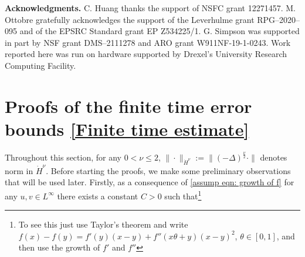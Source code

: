 \documentclass[reqno, 11pt]{amsart}
\theoremstyle{plain}
\theoremstyle{definition}
\theoremstyle{remark}
\numberwithin{equation}{section}
\numberwithin{theorem}{section}
\begin{document}
{{\bf Acknowledgments. } C. Huang thanks the support of NSFC grant 12271457. M. Ottobre  gratefully acknowledges the support of
the Leverhulme grant RPG–2020–095 and of the EPSRC Standard grant EP Z534225/1. G. Simpson  was supported in part by NSF grant DMS–2111278 and ARO grant  W911NF-19-1-0243. Work
reported here was run on hardware supported by Drexel’s University Research Computing
Facility.

\appendix
\section{Proofs of the finite time error bounds \ref{Finite time estimate}}\label{sec: proofs of finite time error bounds}
Throughout this section, for any $0<\nu\leq 2$, $\| \cdot \|_{\dot{H}^{\nu}}:=\|(-\Delta)^{\frac{\nu}{2}}\cdot\|$ denotes norm in $\dot{H}^{\nu}$. Before starting the proofs, we make some preliminary observations that will be used later. Firstly,  as a consequence of \eqref{assump eqn: growth of f}
for any $u,v \in L^\infty$ there exists a constant $C>0$ such that\footnote{To see this just use Taylor's theorem and write $f(x)-f(y) = f'(y)(x-y)+ f''(x\theta+y)(x-y)^2$, $\theta \in [0,1]$, and then use the growth of $f'$ and $f''$}


}
\end{document}
